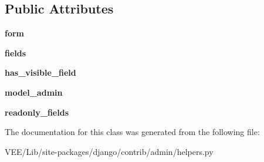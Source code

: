 \subsection*{Public Attributes}
\begin{DoxyCompactItemize}
\item 
\mbox{\label{classdjango_1_1contrib_1_1admin_1_1helpers_1_1_fieldline_a5c0aaef9a67ff53302b2de5c2193b144}} 
{\bfseries form}
\item 
\mbox{\label{classdjango_1_1contrib_1_1admin_1_1helpers_1_1_fieldline_ae524248d2f716b32f539b54b49dff69e}} 
{\bfseries fields}
\item 
\mbox{\label{classdjango_1_1contrib_1_1admin_1_1helpers_1_1_fieldline_a15f482c85516dbdd32f9276d1743d2ef}} 
{\bfseries has\+\_\+visible\+\_\+field}
\item 
\mbox{\label{classdjango_1_1contrib_1_1admin_1_1helpers_1_1_fieldline_af7fd75283dcd3c879ed7ad8ca1259af5}} 
{\bfseries model\+\_\+admin}
\item 
\mbox{\label{classdjango_1_1contrib_1_1admin_1_1helpers_1_1_fieldline_a2be22c5608b21126173af04b23d24d01}} 
{\bfseries readonly\+\_\+fields}
\end{DoxyCompactItemize}


The documentation for this class was generated from the following file\+:\begin{DoxyCompactItemize}
\item 
V\+E\+E/\+Lib/site-\/packages/django/contrib/admin/helpers.\+py\end{DoxyCompactItemize}
